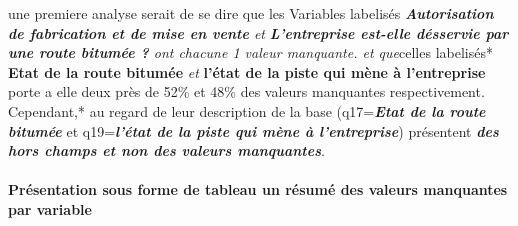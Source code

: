 \documentclass[
]{article}
\begin{document}
\hfill\break
une premiere analyse serait de se dire que les Variables labelisés
\emph{\textbf{Autorisation de fabrication et de mise en vente} et}
\emph{\textbf{L'entreprise est-elle désservie par une route bitumée ?}
ont chacune 1 valeur manquante. et que}celles labelisés* \textbf{Etat de
la route bitumée} \emph{et} \textbf{l'état de la piste qui mène à
l'entreprise} porte a elle deux près de 52\% et 48\% des valeurs
manquantes respectivement.\\
Cependant,* au regard de leur description de la base
(q17=\textbf{\emph{Etat de la route bitumée}} et
q19=\textbf{\emph{l'état de la piste qui mène à l'entreprise}})
présentent \textbf{\emph{des hors champs et non des valeurs
manquantes}}.\\

\hypertarget{pruxe9sentation-sous-forme-de-tableau-un-ruxe9sumuxe9-des-valeurs-manquantes-par-variable}{%
\paragraph{Présentation sous forme de tableau un résumé des valeurs
manquantes par
variable}\label{pruxe9sentation-sous-forme-de-tableau-un-ruxe9sumuxe9-des-valeurs-manquantes-par-variable}}

\hfill\break
\end{document}
